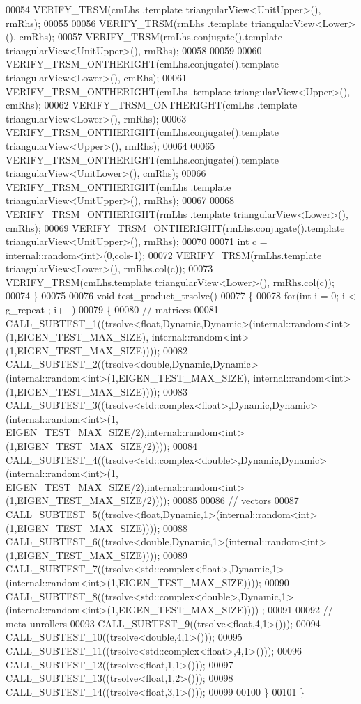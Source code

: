 \begin{DoxyCode}
00054   VERIFY\_TRSM(cmLhs            .\textcolor{keyword}{template} triangularView<UnitUpper>(), rmRhs);
00055 
00056   VERIFY\_TRSM(rmLhs            .\textcolor{keyword}{template} triangularView<Lower>(), cmRhs);
00057   VERIFY\_TRSM(rmLhs.conjugate().template triangularView<UnitUpper>(), rmRhs);
00058 
00059 
00060   VERIFY\_TRSM\_ONTHERIGHT(cmLhs.conjugate().template triangularView<Lower>(), cmRhs);
00061   VERIFY\_TRSM\_ONTHERIGHT(cmLhs            .\textcolor{keyword}{template} triangularView<Upper>(), cmRhs);
00062   VERIFY\_TRSM\_ONTHERIGHT(cmLhs            .\textcolor{keyword}{template} triangularView<Lower>(), rmRhs);
00063   VERIFY\_TRSM\_ONTHERIGHT(cmLhs.conjugate().template triangularView<Upper>(), rmRhs);
00064 
00065   VERIFY\_TRSM\_ONTHERIGHT(cmLhs.conjugate().template triangularView<UnitLower>(), cmRhs);
00066   VERIFY\_TRSM\_ONTHERIGHT(cmLhs            .\textcolor{keyword}{template} triangularView<UnitUpper>(), rmRhs);
00067 
00068   VERIFY\_TRSM\_ONTHERIGHT(rmLhs            .\textcolor{keyword}{template} triangularView<Lower>(), cmRhs);
00069   VERIFY\_TRSM\_ONTHERIGHT(rmLhs.conjugate().template triangularView<UnitUpper>(), rmRhs);
00070 
00071   \textcolor{keywordtype}{int} c = internal::random<int>(0,cols-1);
00072   VERIFY\_TRSM(rmLhs.template triangularView<Lower>(), rmRhs.col(c));
00073   VERIFY\_TRSM(cmLhs.template triangularView<Lower>(), rmRhs.col(c));
00074 \}
00075 
00076 \textcolor{keywordtype}{void} test\_product\_trsolve()
00077 \{
00078   \textcolor{keywordflow}{for}(\textcolor{keywordtype}{int} i = 0; i < g\_repeat ; i++)
00079   \{
00080     \textcolor{comment}{// matrices}
00081     CALL\_SUBTEST\_1((trsolve<float,Dynamic,Dynamic>(internal::random<int>(1,EIGEN\_TEST\_MAX\_SIZE),
      internal::random<int>(1,EIGEN\_TEST\_MAX\_SIZE))));
00082     CALL\_SUBTEST\_2((trsolve<double,Dynamic,Dynamic>(internal::random<int>(1,EIGEN\_TEST\_MAX\_SIZE),
      internal::random<int>(1,EIGEN\_TEST\_MAX\_SIZE))));
00083     CALL\_SUBTEST\_3((trsolve<std::complex<float>,Dynamic,Dynamic>(internal::random<int>(1,
      EIGEN\_TEST\_MAX\_SIZE/2),internal::random<int>(1,EIGEN\_TEST\_MAX\_SIZE/2))));
00084     CALL\_SUBTEST\_4((trsolve<std::complex<double>,Dynamic,Dynamic>(internal::random<int>(1,
      EIGEN\_TEST\_MAX\_SIZE/2),internal::random<int>(1,EIGEN\_TEST\_MAX\_SIZE/2))));
00085 
00086     \textcolor{comment}{// vectors}
00087     CALL\_SUBTEST\_5((trsolve<float,Dynamic,1>(internal::random<int>(1,EIGEN\_TEST\_MAX\_SIZE))));
00088     CALL\_SUBTEST\_6((trsolve<double,Dynamic,1>(internal::random<int>(1,EIGEN\_TEST\_MAX\_SIZE))));
00089     CALL\_SUBTEST\_7((trsolve<std::complex<float>,Dynamic,1>(internal::random<int>(1,EIGEN\_TEST\_MAX\_SIZE))));
00090     CALL\_SUBTEST\_8((trsolve<std::complex<double>,Dynamic,1>(internal::random<int>(1,EIGEN\_TEST\_MAX\_SIZE))))
      ;
00091     
00092     \textcolor{comment}{// meta-unrollers}
00093     CALL\_SUBTEST\_9((trsolve<float,4,1>()));
00094     CALL\_SUBTEST\_10((trsolve<double,4,1>()));
00095     CALL\_SUBTEST\_11((trsolve<std::complex<float>,4,1>()));
00096     CALL\_SUBTEST\_12((trsolve<float,1,1>()));
00097     CALL\_SUBTEST\_13((trsolve<float,1,2>()));
00098     CALL\_SUBTEST\_14((trsolve<float,3,1>()));
00099     
00100   \}
00101 \}
\end{DoxyCode}
